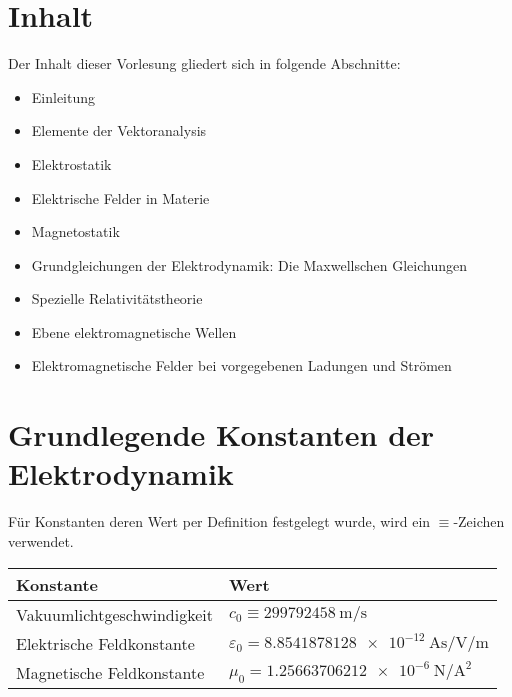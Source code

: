 \section{Inhalt}

Der Inhalt dieser Vorlesung gliedert sich in folgende Abschnitte:

\begin{itemize}
	\item Einleitung

	\item Elemente der Vektoranalysis

	\item Elektrostatik

	\item Elektrische Felder in Materie

	\item Magnetostatik

	\item Grundgleichungen der Elektrodynamik: Die Maxwellschen Gleichungen

	\item Spezielle Relativitätstheorie

	\item Ebene elektromagnetische Wellen

	\item Elektromagnetische Felder bei vorgegebenen Ladungen und Strömen
\end{itemize}



\section{Grundlegende Konstanten der Elektrodynamik}

Für Konstanten deren Wert per Definition festgelegt wurde, wird ein $\equiv $-Zeichen verwendet.


\begin{table}[H]
    \centering
	\begin{tabular}{|l|l|} \hline
		\textbf{Konstante}         & \textbf{Wert} \\\hline
		Vakuumlichtgeschwindigkeit & \centering\arraybackslash{}$c_{0}\equiv \SI{299792458}{\m\per\s}$  \\
		Elektrische Feldkonstante  & $\varepsilon _{0}=\SI{8,8541878128e-12}{\A\s\per\V\per\m}$ \\
		Magnetische Feldkonstante  & $\mu _{0}=\SI{1,25663706212e-6}{\N\per\square\A}$  \\
		\hline
	\end{tabular}
\end{table}




